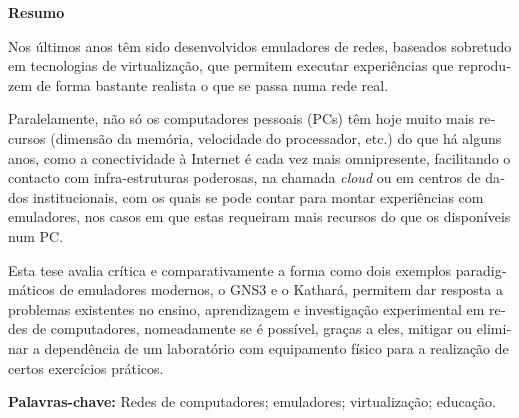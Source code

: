 
\cleardoublepage\thispagestyle{plain}

\begin{otherlanguage}{portuguese}
  \textbf{\Large Resumo}

  Nos últimos anos têm sido desenvolvidos emuladores de redes, baseados sobretudo em tecnologias de virtualização, que permitem executar experiências que reproduzem de forma bastante realista o que se passa numa rede real.

  Paralelamente, não só os computadores pessoais (PCs) têm hoje muito mais recursos (dimensão da memória, velocidade do processador, etc.) do que há alguns anos, como a conectividade à Internet é cada vez mais omnipresente, facilitando o contacto com infra-estruturas poderosas, na chamada \emph{cloud} ou em centros de dados institucionais, com os quais se pode contar para montar experiências com emuladores, nos casos em que estas requeiram mais recursos do que os disponíveis num PC.

  Esta tese avalia crítica e comparativamente a forma como dois exemplos paradigmáticos de emuladores modernos, o GNS3 e o Kathará, permitem dar resposta a problemas existentes no ensino, aprendizagem e investigação experimental em redes de computadores, nomeadamente se é possível, graças a eles, mitigar ou eliminar a dependência de um laboratório com equipamento físico para a realização de certos exercícios práticos.

  \textbf{Palavras-chave:} Redes de computadores; emuladores; virtualização; educação.
\end{otherlanguage}
